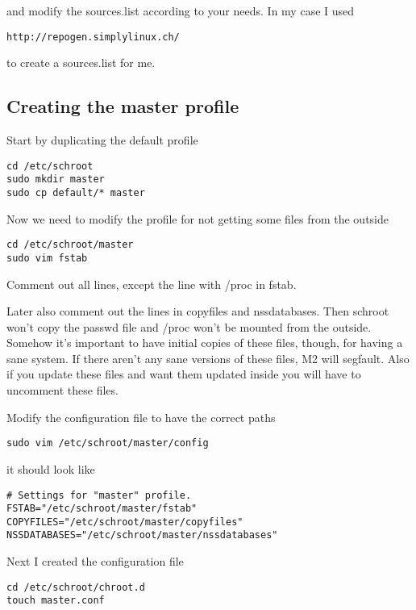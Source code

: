 \documentclass[a4paper]{book}
\begin{document}
and modify the sources.list according to your needs. In my case I used

\begin{verbatim}
http://repogen.simplylinux.ch/
\end{verbatim}

to create a sources.list for me.
\subsection{Creating the master profile}

Start by duplicating the default profile

\begin{verbatim}
cd /etc/schroot
sudo mkdir master
sudo cp default/* master
\end{verbatim}

Now we need to modify the profile for not getting some files from the outside

\begin{verbatim}
cd /etc/schroot/master
sudo vim fstab
\end{verbatim}

Comment out all lines, except the line with /proc in fstab. 

Later also comment out the lines in copyfiles and nssdatabases.  Then schroot
won't copy the passwd file and /proc won't be mounted from the outside.
Somehow it's important to have initial copies of these files, though, for
having a sane system. If there aren't any sane versions of these files, M2 will
segfault.  Also if you update these files and want them updated inside you will
have to uncomment these files.

Modify the configuration file to have the correct paths

\begin{verbatim}
sudo vim /etc/schroot/master/config
\end{verbatim}

it should look like

\begin{verbatim}
# Settings for "master" profile.
FSTAB="/etc/schroot/master/fstab"
COPYFILES="/etc/schroot/master/copyfiles"
NSSDATABASES="/etc/schroot/master/nssdatabases"
\end{verbatim}

Next I created the configuration file

\begin{verbatim}
cd /etc/schroot/chroot.d
touch master.conf
\end{verbatim}
\end{document}
